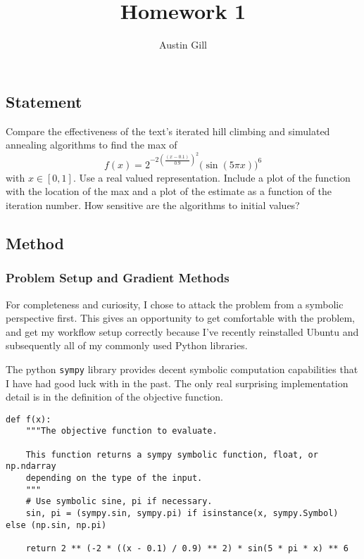 \documentclass{article}
\title{Homework 1}
\author{Austin Gill}
\begin{document}
\maketitle

\section{}\label{prob:1}

\subsection{Statement}
Compare the effectiveness of the text's iterated hill climbing and simulated annealing algorithms
to find the max of
\[ f(x) = 2^{-2{\left(\frac{(x - 0.1)}{0.9}\right)}^2}{\big(\sin(5\pi x)\big)}^6\]
with $x\in [0,1]$. Use a real valued representation. Include a plot of the function with the
location of the max and a plot of the estimate as a function of the iteration number. How sensitive
are the algorithms to initial values?

\subsection{Method}

\subsubsection{Problem Setup and Gradient Methods}

For completeness and curiosity, I chose to attack the problem from a symbolic perspective first.
This gives an opportunity to get comfortable with the problem, and get my workflow setup correctly
because I've recently reinstalled Ubuntu and subsequently all of my commonly used Python libraries.

The python \texttt{sympy} library provides decent symbolic computation capabilities
that I have had good luck with in the past. The only real surprising implementation detail is in
the definition of the objective function.

\begin{verbatim}
def f(x):
    """The objective function to evaluate.

    This function returns a sympy symbolic function, float, or np.ndarray
    depending on the type of the input.
    """
    # Use symbolic sine, pi if necessary.
    sin, pi = (sympy.sin, sympy.pi) if isinstance(x, sympy.Symbol) else (np.sin, np.pi)

    return 2 ** (-2 * ((x - 0.1) / 0.9) ** 2) * sin(5 * pi * x) ** 6
\end{verbatim}
\end{document}
